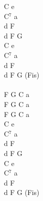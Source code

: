 \documentclass[a5paper, 10pt]{book}
\begin{document}
\begin{minipage}[t]{0.2\textwidth}
  C e\\
  C$^7$ a\\
  d F\\
  d F G\vspace*{2mm}
  \\
  C e\\
  C$^7$ a\\
  d F\\
  d F G (Fis)\\
  \\
  F G C a\\
  F G C a\\
  F G C a\\

  C e\\
  C$^7$ a\\
  d F\\
  d F G\vspace*{2mm}
  \\
  C e\\
  C$^7$ a\\
  d F\\
  d F G (Fis)\\
  \\
\end{minipage}

\end{document}

